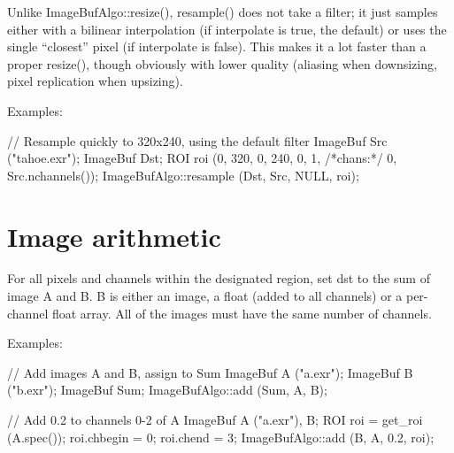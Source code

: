 Unlike {\cf ImageBufAlgo::resize()}, {\cf resample()} does not take a filter; it
just samples either with a bilinear interpolation (if {\cf interpolate} is
{\cf true}, the default) or uses the single ``closest'' pixel (if
{\cf interpolate} is {\cf false}).  This makes it a lot faster than a proper
{\cf resize()}, though obviously with lower quality (aliasing when
downsizing, pixel replication when upsizing).

\smallskip
\noindent Examples:
\begin{code}
    // Resample quickly to 320x240, using the default filter
    ImageBuf Src ("tahoe.exr");
    ImageBuf Dst;
    ROI roi (0, 320, 0, 240, 0, 1, /*chans:*/ 0, Src.nchannels());
    ImageBufAlgo::resample (Dst, Src, NULL, roi);
\end{code}
\apiend



\section{Image arithmetic}
\label{sec:iba:arith}

 

For all pixels and channels within the designated region, set
{\cf dst} to the sum of image {\cf A} and {\cf B}.  {\cf B} is either an image,
a float (added to all channels) or a per-channel float array.
All of the images must have the same number of channels.

\smallskip
\noindent Examples:
\begin{code}
    // Add images A and B, assign to Sum
    ImageBuf A ("a.exr");
    ImageBuf B ("b.exr");
    ImageBuf Sum;
    ImageBufAlgo::add (Sum, A, B);

    // Add 0.2 to channels 0-2 of A
    ImageBuf A ("a.exr"), B;
    ROI roi = get_roi (A.spec());
    roi.chbegin = 0;  roi.chend = 3;
    ImageBufAlgo::add (B, A, 0.2, roi);
\end{code}
\apiend



